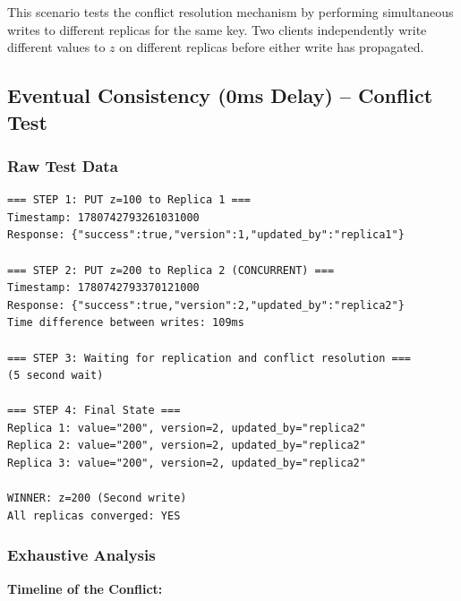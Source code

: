 \documentclass[10pt,a4paper]{article}
\begin{document}
This scenario tests the conflict resolution mechanism by performing simultaneous writes to different replicas for the same key. Two clients independently write different values to $z$ on different replicas before either write has propagated.

\subsection{Eventual Consistency (0ms Delay) -- Conflict Test}

\subsubsection{Raw Test Data}

\begin{verbatim}
=== STEP 1: PUT z=100 to Replica 1 ===
Timestamp: 1780742793261031000
Response: {"success":true,"version":1,"updated_by":"replica1"}

=== STEP 2: PUT z=200 to Replica 2 (CONCURRENT) ===
Timestamp: 1780742793370121000
Response: {"success":true,"version":2,"updated_by":"replica2"}
Time difference between writes: 109ms

=== STEP 3: Waiting for replication and conflict resolution ===
(5 second wait)

=== STEP 4: Final State ===
Replica 1: value="200", version=2, updated_by="replica2"
Replica 2: value="200", version=2, updated_by="replica2"
Replica 3: value="200", version=2, updated_by="replica2"

WINNER: z=200 (Second write)
All replicas converged: YES
\end{verbatim}

\subsubsection{Exhaustive Analysis}

\textbf{Timeline of the Conflict:}
\end{document}
